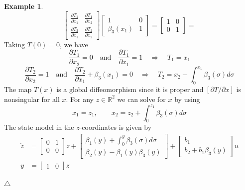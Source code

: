 \documentclass[11pt,a4paper,oneside]{book}
\numberwithin{equation}{section}
\theoremstyle{it}
\theoremstyle{definition}
\newtheorem{example}{Example}[section]
\begin{document}
\begin{example}
\begin{equation*}
		\begin{bmatrix}
			\frac{\partial T_1}{\partial x_1} & \frac{\partial T_1}{\partial x_2} \\[6pt] \frac{\partial T_2}{\partial x_1} & \frac{\partial T_2}{\partial x_2}
		\end{bmatrix}
		\begin{bmatrix}
			1 & 0 \\[6pt] \beta_3(x_1) & 1
		\end{bmatrix}=
		\begin{bmatrix}
			1 & 0 \\[6pt] 0 & 1
		\end{bmatrix}=	
	\end{equation*}
	Taking $T(0)=0$, we have 
	\begin{equation*}
		\frac{\partial T_1}{\partial x_2}=0\quad\text{and}\quad\frac{\partial T_1}{\partial x_1}=1\quad\Rightarrow\quad T_1=x_1
	\end{equation*}
	\begin{equation*}
		\frac{\partial T_2}{\partial x_2}=1\quad\text{and}\quad\frac{\partial T_2}{\partial x_1}+\beta_3(x_1)=0\quad\Rightarrow\quad T_2=x_2-\int_{0}^{x_1}\beta_3(\sigma)d\sigma
	\end{equation*}
	The map $T(x)$ is a global diffeomorphism since it is proper and $[\partial T/\partial x]$ is nonsingular for all $x$. For any $z\in\mathbb{R}^2$ we can solve for $x$ by using
	\begin{equation*}
		x_1=z_1,\qquad x_2=z_2+\int_{0}^{z_1}\beta_3(\sigma)d\sigma
	\end{equation*}
	The state model in the $z$-coordinates is given by
	\begin{equation*}
		\begin{aligned}
			\dot{z} &= \begin{bmatrix} 0&1\\[6pt]0&0 \end{bmatrix}z+\begin{bmatrix} \beta_1(y)+\int_{0}^{y}\beta_3(\sigma)d\sigma \\[6pt] \beta_2(y)-\beta_1(y)\beta_3(y)\end{bmatrix}+\begin{bmatrix} b_1 \\[6pt] b_2+b_1\beta_3(y) \end{bmatrix}u \\[8pt]
			y &= \begin{bmatrix} 1 & 0 \end{bmatrix}z
		\end{aligned}
	\end{equation*}
	
			\hfill$\triangle$
\end{example}
\end{document}
